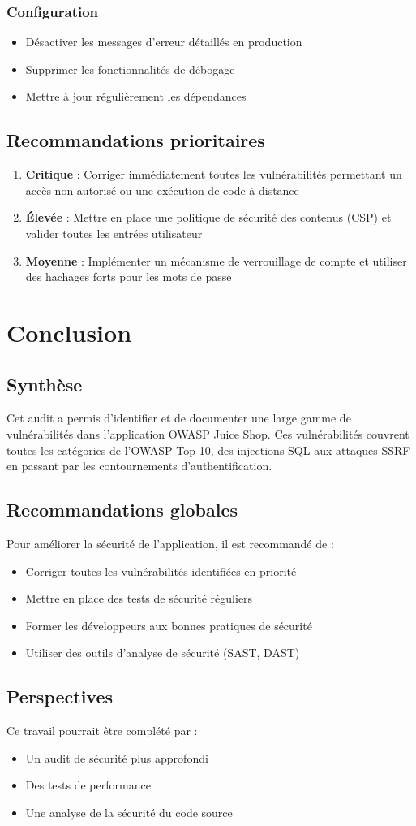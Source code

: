 \documentclass[12pt,a4paper]{report}
\begin{document}
\subsection{Configuration}
\begin{itemize}
    \item Désactiver les messages d'erreur détaillés en production
    \item Supprimer les fonctionnalités de débogage
    \item Mettre à jour régulièrement les dépendances
\end{itemize}

\section{Recommandations prioritaires}
\begin{enumerate}
    \item \textbf{Critique} : Corriger immédiatement toutes les vulnérabilités permettant un accès non autorisé ou une exécution de code à distance
    \item \textbf{Élevée} : Mettre en place une politique de sécurité des contenus (CSP) et valider toutes les entrées utilisateur
    \item \textbf{Moyenne} : Implémenter un mécanisme de verrouillage de compte et utiliser des hachages forts pour les mots de passe
\end{enumerate}

\chapter{Conclusion}

\section{Synthèse}
Cet audit a permis d'identifier et de documenter une large gamme de vulnérabilités dans l'application OWASP Juice Shop. Ces vulnérabilités couvrent toutes les catégories de l'OWASP Top 10, des injections SQL aux attaques SSRF en passant par les contournements d'authentification.

\section{Recommandations globales}
Pour améliorer la sécurité de l'application, il est recommandé de :
\begin{itemize}
    \item Corriger toutes les vulnérabilités identifiées en priorité
    \item Mettre en place des tests de sécurité réguliers
    \item Former les développeurs aux bonnes pratiques de sécurité
    \item Utiliser des outils d'analyse de sécurité (SAST, DAST)
\end{itemize}

\section{Perspectives}
Ce travail pourrait être complété par :
\begin{itemize}
    \item Un audit de sécurité plus approfondi
    \item Des tests de performance
    \item Une analyse de la sécurité du code source
\end{itemize}
\end{document}
